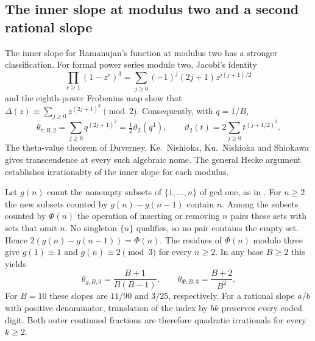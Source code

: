 \documentclass[11pt,a4paper]{article}
\begin{document}
\subsection{The inner slope at modulus two and a second rational slope}

The inner slope for Ramanujan's function at modulus two has a stronger classification.
For formal power series modulo two, Jacobi's identity
\[
 \prod_{r\ge1}(1-z^r)^3
   =\sum_{j\ge0}(-1)^j(2j+1)z^{j(j+1)/2}
\]
and the eighth-power Frobenius map show that
\(\Delta(z)\equiv\sum_{j\ge0}z^{(2j+1)^2}\pmod2\).
Consequently, with \(q=1/B\),
\[
\theta_{\tau,B,2}=\sum_{j\ge0}q^{(2j+1)^2}=\tfrac12\vartheta_2(q^4),
\qquad
\vartheta_2(t)=2\sum_{j\ge0} t^{(j+1/2)^2}.
\]
The theta-value theorem of Duverney, Ke.~Nishioka, Ku.~Nishioka and Shiokawa
\cite{dnns-theta} gives transcendence at every such algebraic nome. The
general Hecke argument establishes irrationality of the inner slope for
each modulus.

Let \(g(n)\) count the nonempty subsets of \(\{1,\ldots,n\}\) of gcd one,
as in \cite{cm}. For \(n\ge2\) the new subsets counted by
\(g(n)-g(n-1)\) contain \(n\). Among the subsets counted by \(\Phi(n)\)
the operation of inserting or removing \(n\) pairs these sets with
sets that omit \(n\). No singleton \(\{n\}\) qualifies, so no pair
contains the empty set. Hence \(2(g(n)-g(n-1))=\Phi(n)\).
The residues of \(\Phi(n)\) modulo three give
\(g(1)\equiv1\) and \(g(n)\equiv2\pmod3\) for every \(n\ge2\).
In any base \(B\ge2\) this yields
\[
 \theta_{g,B,3}=\frac{B+1}{B(B-1)},\qquad
 \theta_{\Phi,B,3}=\frac{B+2}{B^2}.
\]
For \(B=10\) these slopes are \(11/90\) and \(3/25\), respectively.
For a rational slope \(a/b\) with positive denominator, translation
of the index by \(bk\) preserves every coded digit. Both outer
continued fractions are therefore quadratic irrationals for every \(k\ge2\).
\end{document}
